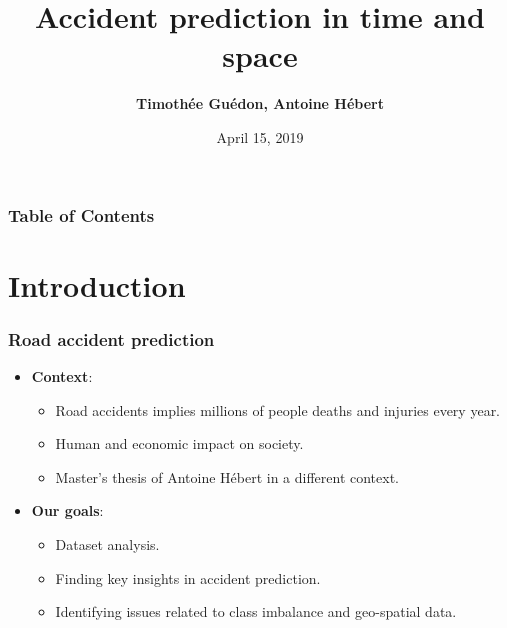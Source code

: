 \documentclass[slidestop,compress,red,mathserif]{beamer}
\title[My Title]{Accident prediction in time and space}
\author[My~Name]{
\textbf{Timothée Guédon, Antoine Hébert}}
\institute[My Institute/company]
{Concordia University \\ Computer Science and Software Engineering Department}
\date[]{April 15, 2019}
\begin{document}
\begin{frame} %
\titlepage
\end{frame}


\begin{frame}
\frametitle{Table of Contents}
\tableofcontents
\end{frame}


\section{Introduction}


\begin{frame}
\frametitle{Road accident prediction}

\begin{scriptsize}

\begin{itemize}
\item[] \textbf{Context}:
  \begin{itemize}
    \item Road accidents implies millions of people deaths and injuries every year.
		\item Human and economic impact on society.
    \item Master’s thesis of Antoine Hébert in a different context.
  \end{itemize}

\item[] \textbf{Our goals}:
  \begin{itemize}
    \item Dataset analysis.
  	\item Finding key insights in accident prediction.
  	\item Identifying issues related to class imbalance and geo-spatial data.
  \end{itemize}
\end{itemize}

\end{scriptsize}

\end{frame}
\end{document}
